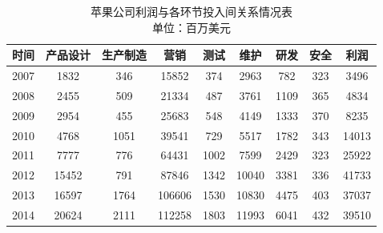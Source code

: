 \documentclass[12pt]{article}%
\begin{document}
\begin{table}[htbp]
  \centering
  \caption{苹果公司利润与各环节投入间关系情况表\\单位：百万美元}
    \begin{tabular}{ccccccccc}
    \hline
    时间 & 产品设计 & 生产制造 & 营销 & 测试 & 维护 & 研发 & 安全 & 利润 \\
        \hline
    2007 & 1832 & 346 & 15852 & 374 & 2963 & 782 & 323 & 3496 \\
    2008 & 2455 & 509 & 21334 & 487 & 3761 & 1109 & 365 & 4834 \\
    2009 & 2954 & 455 & 25683 & 548 & 4149 & 1333 & 370 & 8235 \\
    2010 & 4768 & 1051 & 39541 & 729 & 5517 & 1782 & 343 & 14013 \\
    2011 & 7777 & 776 & 64431 & 1002 & 7599 & 2429 & 323 & 25922 \\
    2012 & 15452 & 791 & 87846 & 1342 & 10040 & 3381 & 336 & 41733 \\
    2013 & 16597 & 1764 & 106606 & 1530 & 10830 & 4475 & 403 & 37037 \\
    2014 & 20624 & 2111 & 112258 & 1803 & 11993 & 6041 & 432 & 39510 \\
        \hline
    \end{tabular}%
  \label{tab:addlabel11}%
\end{table}%
\end{document}

